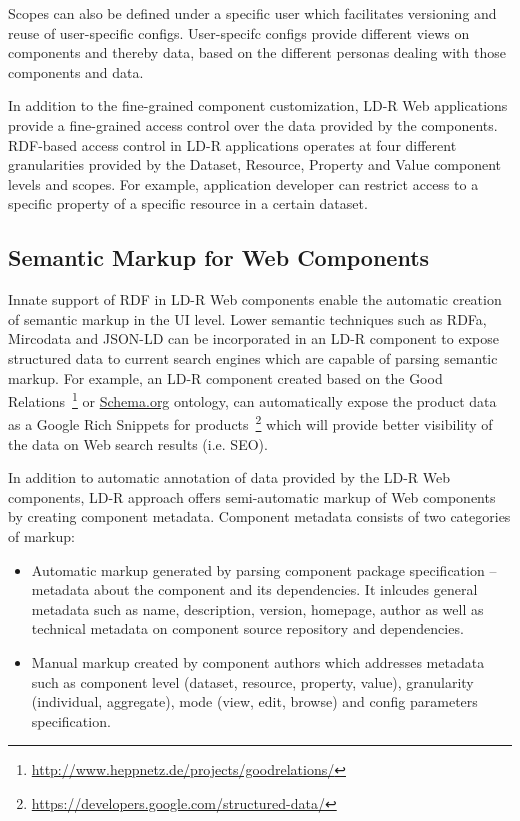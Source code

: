 \documentclass{acm_proc_article-sp}
\begin{document}
Scopes can also be defined under a specific user which facilitates versioning and reuse of user-specific configs.
User-specifc configs provide different views on components and thereby data, based on the different personas dealing with those components and data.

In addition to the fine-grained component customization, LD-R Web applications provide a fine-grained access control over the data provided by the components.
RDF-based access control in LD-R applications operates at four different granularities provided by the Dataset, Resource, Property and Value component levels and scopes.
For example, application developer can restrict access to a specific property of a specific resource in a certain dataset.

\subsection{Semantic Markup for Web Components}
\label{sec:markup}
Innate support of RDF in LD-R Web components enable the automatic creation of semantic markup in the UI level.
Lower semantic techniques such as RDFa, Mircodata and JSON-LD can be incorporated in an LD-R component to expose structured data to current search engines which are capable of parsing semantic markup.
For example, an LD-R component created based on the Good Relations~\footnote{\url{http://www.heppnetz.de/projects/goodrelations/}} or \url{Schema.org} ontology, can automatically expose the product data as a Google Rich Snippets for products~\footnote{\url{https://developers.google.com/structured-data/}} which will provide better visibility of the data on Web search results (i.e. SEO).

In addition to automatic annotation of data provided by the LD-R Web components, LD-R approach offers semi-automatic markup of Web components by creating component metadata. 
Component metadata consists of two categories of markup:
\begin{itemize}
\item Automatic markup generated by parsing component package specification -- metadata about the component and its dependencies. It inlcudes general metadata such as name, description, version, homepage, author as well as technical metadata on component source repository and dependencies.

\item Manual markup created by component authors which addresses metadata such as component level (dataset, resource, property, value), granularity (individual, aggregate), mode (view, edit, browse) and config parameters specification.

\end{itemize}
\end{document}
